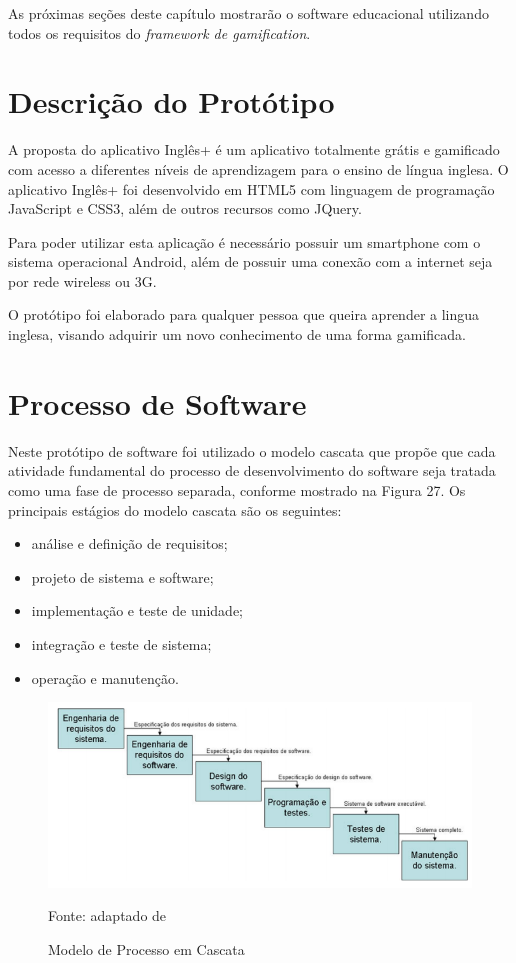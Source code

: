 \documentclass[
	12pt,				%
	openany,			%
	oneside,			%
	a4paper,			%
	english,			%
	french,				%
	spanish,			%
	brazil				%
	]{abntex2}
\begin{document}
As próximas seções deste capítulo mostrarão o software educacional utilizando todos os requisitos do \textit{framework de gamification}.


\section{Descrição do Protótipo}

A proposta do aplicativo Inglês+ é um aplicativo totalmente grátis e gamificado com acesso a diferentes níveis de aprendizagem para o ensino de língua inglesa. O aplicativo Inglês+ foi desenvolvido em HTML5 com linguagem de programação JavaScript e CSS3, além de outros recursos como JQuery.

Para poder utilizar esta aplicação é necessário possuir um smartphone com o sistema operacional Android, além de possuir uma conexão com a internet seja por rede wireless ou 3G.

O protótipo foi elaborado para qualquer pessoa que queira aprender a lingua inglesa, visando adquirir um novo conhecimento de uma forma gamificada.

\section{Processo de Software}
Neste protótipo de software foi utilizado o modelo cascata que propõe que cada atividade fundamental do processo de desenvolvimento do software seja tratada como uma fase de processo separada, conforme mostrado na Figura 27. Os principais estágios do modelo cascata são os seguintes:

\begin{itemize}
\item análise e definição de requisitos;
\item projeto de sistema e software;
\item implementação e teste de unidade;
\item integração e teste de sistema;
\item operação e manutenção.
\end{itemize}

\begin{figure}[H]
    \centering
\caption{Modelo de Processo em Cascata}
\includegraphics[width=14cm]{figuras/cascata.png}
\par
 Fonte: adaptado de 
\end{figure}
\end{document}
